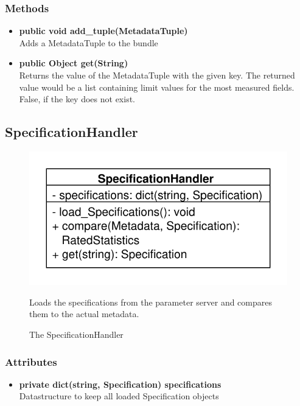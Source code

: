 \subsubsection{Methods}
\begin{itemize}
	\item \textbf{public void add\_tuple(MetadataTuple)}\\
	Adds a MetadataTuple to the bundle
	\item \textbf{public Object get(String)}\\
	Returns the value of the MetadataTuple with the given key. The returned value would be a list containing limit values for the most measured fields. False, if the key does not exist.
\end{itemize}


\subsection{SpecificationHandler}
\begin{figure}[htbp]
	\begin{minipage}[t]{7cm}
		\vspace{0pt}
		\centering
		\includegraphics[scale=0.6]{./diagram_pictures/SpecificationHandler.pdf}
		\caption{The SpecificationHandler}
	\end{minipage}
	\hfill
	\begin{minipage}[t]{8cm}
		\vspace{10pt}
		Loads the specifications from the parameter server and compares them to the actual metadata.
	\end{minipage}
\end{figure}

\subsubsection{Attributes}
\begin{itemize}
	\item \textbf{private dict(string, Specification) specifications}\\
	Datastructure to keep all loaded Specification objects
\end{itemize}
